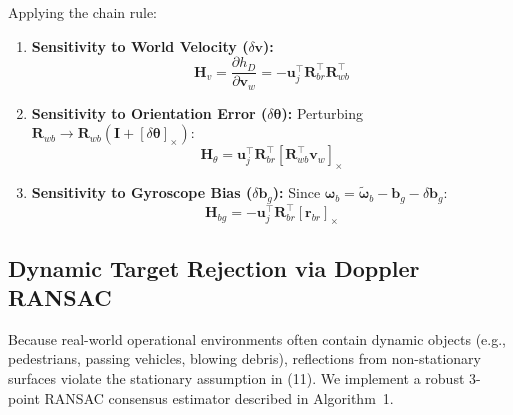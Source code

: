 \documentclass[lettersize,journal]{IEEEtran}
\begin{document}
Applying the chain rule:
\begin{enumerate}
    \item \textbf{Sensitivity to World Velocity ($\delta \mathbf{v}$):}
    \begin{equation}
    \mathbf{H}_v = \frac{\partial h_D}{\partial \mathbf{v}_w} = - \mathbf{u}_j^\top \mathbf{R}_{br}^\top \mathbf{R}_{wb}^\top
    \end{equation}
    \item \textbf{Sensitivity to Orientation Error ($\delta \boldsymbol{\theta}$):}
    Perturbing $\mathbf{R}_{wb} \to \mathbf{R}_{wb} (\mathbf{I} + [\delta \boldsymbol{\theta}]_\times)$:
    \begin{equation}
    \mathbf{H}_\theta = \mathbf{u}_j^\top \mathbf{R}_{br}^\top [ \mathbf{R}_{wb}^\top \mathbf{v}_w ]_\times
    \end{equation}
    \item \textbf{Sensitivity to Gyroscope Bias ($\delta \mathbf{b}_g$):}
    Since $\boldsymbol{\omega}_b = \tilde{\boldsymbol{\omega}}_b - \mathbf{b}_g - \delta \mathbf{b}_g$:
    \begin{equation}
    \mathbf{H}_{bg} = - \mathbf{u}_j^\top \mathbf{R}_{br}^\top [\mathbf{r}_{br}]_\times
    \end{equation}
\end{enumerate}

\subsection{Dynamic Target Rejection via Doppler RANSAC}
Because real-world operational environments often contain dynamic objects (e.g., pedestrians, passing vehicles, blowing debris), reflections from non-stationary surfaces violate the stationary assumption in (11). 
We implement a robust 3-point RANSAC consensus estimator described in Algorithm~1.
\end{document}
